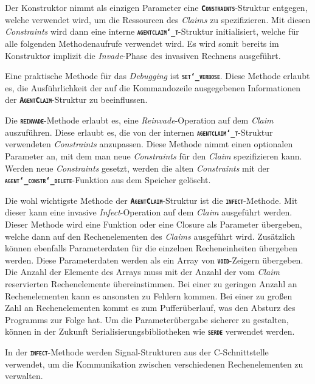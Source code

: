 Der Konstruktor nimmt als einzigen Parameter eine \texttt{\textsc{\textbf{Constraints}}}-Struktur entgegen,
welche verwendet wird, um die Ressourcen des \textit{Claims} zu spezifizieren.
Mit diesen \textit{Constraints} wird dann eine interne
\texttt{\textsc{\textbf{agentclaim\char`_t}}}-Struktur initialisiert,
welche für alle folgenden Methodenaufrufe verwendet wird. Es wird somit bereits im Konstruktor implizit die
\textit{Invade}-Phase des invasiven Rechnens ausgeführt.

Eine praktische Methode für das \textit{Debugging} ist \texttt{\textsc{\textbf{set\char`_verbose}}}.
Diese Methode erlaubt es, die Ausführlichkeit der auf die Kommandozeile ausgegebenen Informationen der
\texttt{\textsc{\textbf{AgentClaim}}}-Struktur zu beeinflussen.

Die \texttt{\textsc{\textbf{reinvade}}}-Methode erlaubt es, eine \textit{Reinvade}-Operation auf dem
\textit{Claim} auszuführen. Diese erlaubt es, die von der internen
\texttt{\textsc{\textbf{agentclaim\char`_t}}}-Struktur verwendeten \textit{Constraints} anzupassen.
Diese Methode nimmt einen optionalen Parameter an,
mit dem man neue \textit{Constraints} für den \textit{Claim} spezifizieren kann.
Werden neue \textit{Constraints} gesetzt, werden die alten \textit{Constraints} mit der
\texttt{\textsc{\textbf{agent\char`_constr\char`_delete}}}-Funktion aus dem Speicher gelöscht. 

Die wohl wichtigste Methode der \texttt{\textsc{\textbf{AgentClaim}}}-Struktur ist die
\texttt{\textsc{\textbf{infect}}}-Methode. Mit dieser kann eine invasive \textit{Infect}-Operation
auf dem \textit{Claim} ausgeführt werden.
Dieser Methode wird eine Funktion oder eine Closure als Parameter übergeben,
welche dann auf den Rechenelementen des \textit{Claims} ausgeführt wird.
Zusätzlich können ebenfalls Parameterdaten für die einzelnen Recheneinheiten übergeben werden.
Diese Parameterdaten werden als ein Array von \texttt{\textsc{\textbf{void}}}-Zeigern übergeben.
Die Anzahl der Elemente des Arrays muss mit der Anzahl der vom \textit{Claim} reservierten Rechenelemente 
übereinstimmen. Bei einer zu geringen Anzahl an Rechenelementen kann es ansonsten zu Fehlern kommen.
Bei einer zu großen Zahl an Rechenelementen kommt es zum Pufferüberlauf, was den Absturz des Programms zur
Folge hat. Um die Parameterübergabe sicherer zu gestalten, können in der Zukunft Serialisierungsbibliotheken
wie \texttt{\textsc{\textbf{serde}}} verwendet werden.

In der \texttt{\textsc{\textbf{infect}}}-Methode werden Signal-Strukturen aus der C-Schnittstelle verwendet,
um die Kommunikation zwischen verschiedenen Rechenelementen zu verwalten.

